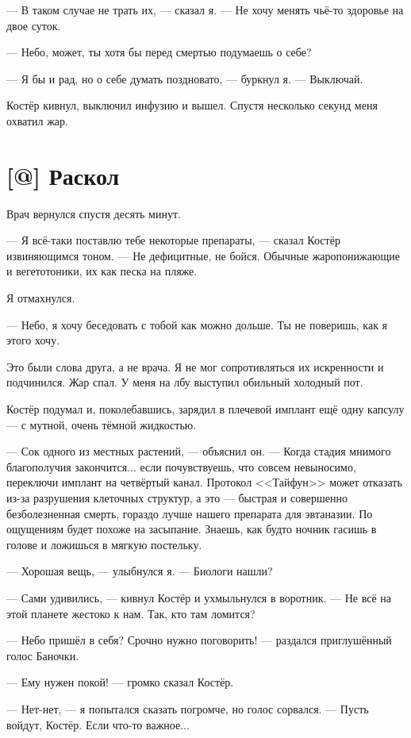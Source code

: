 --- В таком случае не трать их, --- сказал я.
--- Не хочу менять чьё-то здоровье на двое суток.

--- Небо, может, ты хотя бы перед смертью подумаешь о себе?

--- Я бы и рад, но о себе думать поздновато, --- буркнул я.
--- Выключай.

Костёр кивнул, выключил инфузию и вышел.
Спустя несколько секунд меня охватил жар.

\section{[@] Раскол}

Врач вернулся спустя десять минут.

--- Я всё-таки поставлю тебе некоторые препараты, --- сказал Костёр извиняющимся тоном.
--- Не дефицитные, не бойся.
Обычные жаропонижающие и вегетотоники, их как песка на пляже.

Я отмахнулся.

--- Небо, я хочу беседовать с тобой как можно дольше.
Ты не поверишь, как я этого хочу.

Это были слова друга, а не врача.
Я не мог сопротивляться их искренности и подчинился.
Жар спал.
У меня на лбу выступил обильный холодный пот.

Костёр подумал и, поколебавшись, зарядил в плечевой имплант ещё одну капсулу --- с мутной, очень тёмной жидкостью.

--- Сок одного из местных растений, --- объяснил он.
--- Когда стадия мнимого благополучия закончится... если почувствуешь, что совсем невыносимо, переключи имплант на четвёртый канал.
Протокол <<Тайфун>> может отказать из-за разрушения клеточных структур, а это --- быстрая и совершенно безболезненная смерть, гораздо лучше нашего препарата для эвтаназии.
По ощущениям будет похоже на засыпание.
Знаешь, как будто ночник гасишь в голове и ложишься в мягкую постельку.

--- Хорошая вещь, --- улыбнулся я.
--- Биологи нашли?

--- Сами удивились, --- кивнул Костёр и ухмыльнулся в воротник.
--- Не всё на этой планете жестоко к нам.
Так, кто там ломится?

--- Небо пришёл в себя? Срочно нужно поговорить! --- раздался приглушённый голос Баночки.

--- Ему нужен покой! --- громко сказал Костёр.

--- Нет-нет, --- я попытался сказать погромче, но голос сорвался.
--- Пусть войдут, Костёр.
Если что-то важное...

